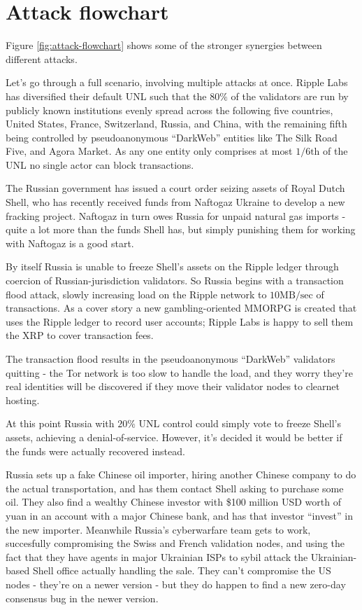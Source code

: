 \documentclass{article}
\begin{document}
\begin{itemize}
\end{itemize}


\section{Attack flowchart}

Figure \ref{fig:attack-flowchart} shows some of the stronger synergies between
different attacks.

Let's go through a full scenario, involving multiple attacks at once.  Ripple
Labs has diversified their default UNL such that the $80\%$ of the validators
are run by publicly known institutions evenly spread across the following five
countries, United States, France, Switzerland, Russia, and China, with the
remaining fifth being controlled by pseudoanonymous ``DarkWeb'' entities like
The Silk Road Five, and Agora Market. As any one entity only comprises at most
$1/6\text{th}$ of the UNL no single actor can block transactions.

The Russian government has issued a court order seizing assets of Royal Dutch
Shell, who has recently received funds from Naftogaz Ukraine to develop a new
fracking project. Naftogaz in turn owes Russia for unpaid natural gas imports -
quite a lot more than the funds Shell has, but simply punishing them for
working with Naftogaz is a good start.

By itself Russia is unable to freeze Shell's assets on the Ripple ledger
through coercion of Russian-jurisdiction validators. So Russia begins with a
transaction flood attack, slowly increasing load on the Ripple network to
$10\text{MB}/\text{sec}$ of transactions. As a cover story a new
gambling-oriented MMORPG is created that uses the Ripple ledger to record user
accounts; Ripple Labs is happy to sell them the XRP to cover transaction fees.

The transaction flood results in the pseudoanonymous ``DarkWeb'' validators
quitting - the Tor network is too slow to handle the load, and they worry
they're real identities will be discovered if they move their validator nodes
to clearnet hosting.

At this point Russia with $20\%$ UNL control could simply vote to freeze
Shell's assets, achieving a denial-of-service. However, it's decided it would
be better if the funds were actually recovered instead.

Russia sets up a fake Chinese oil importer, hiring another Chinese company to
do the actual transportation, and has them contact Shell asking to purchase
some oil. They also find a wealthy Chinese investor with \$100 million USD
worth of yuan in an account with a major Chinese bank, and has that investor
``invest'' in the new importer. Meanwhile Russia's cyberwarfare team gets to
work, succesfully compromising the Swiss and French validation nodes, and
using the fact that they have agents in major Ukrainian ISPs to sybil attack
the Ukrainian-based Shell office actually handling the sale. They can't
compromise the US nodes - they're on a newer version - but they do happen to
find a new zero-day consensus bug in the newer version.
\end{document}
